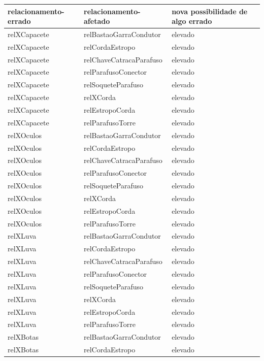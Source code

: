 \documentclass[12pt]{article}
\begin{document}
\begin{table}[H]
\centering
{}
\begin{tabular}{|l|l|l|}
\hline
\textbf{relacionamento-errado} & \textbf{relacionamento-afetado} & \textbf{nova possibilidade de algo errado} \\ \hline
relXCapacete & relBastaoGarraCondutor & elevado \\ \hline
relXCapacete & relCordaEstropo & elevado \\ \hline
relXCapacete & relChaveCatracaParafuso & elevado \\ \hline
relXCapacete & relParafusoConector & elevado \\ \hline
relXCapacete & relSoqueteParafuso & elevado \\ \hline
relXCapacete & relXCorda & elevado \\ \hline
relXCapacete & relEstropoCorda & elevado \\ \hline
relXCapacete & relParafusoTorre & elevado \\ \hline
relXOculos & relBastaoGarraCondutor & elevado \\ \hline
relXOculos & relCordaEstropo & elevado \\ \hline
relXOculos & relChaveCatracaParafuso & elevado \\ \hline
relXOculos & relParafusoConector & elevado \\ \hline
relXOculos & relSoqueteParafuso & elevado \\ \hline
relXOculos & relXCorda & elevado \\ \hline
relXOculos & relEstropoCorda & elevado \\ \hline
relXOculos & relParafusoTorre & elevado \\ \hline
relXLuva & relBastaoGarraCondutor & elevado \\ \hline
relXLuva & relCordaEstropo & elevado \\ \hline
relXLuva & relChaveCatracaParafuso & elevado \\ \hline
relXLuva & relParafusoConector & elevado \\ \hline
relXLuva & relSoqueteParafuso & elevado \\ \hline
relXLuva & relXCorda & elevado \\ \hline
relXLuva & relEstropoCorda & elevado \\ \hline
relXLuva & relParafusoTorre & elevado \\ \hline
relXBotas & relBastaoGarraCondutor & elevado \\ \hline
relXBotas & relCordaEstropo & elevado \\ \hline

\end{tabular}
\end{table}
\end{document}
